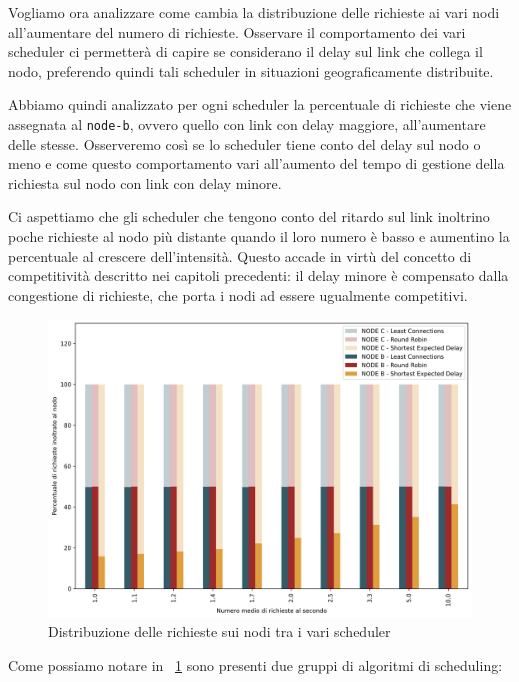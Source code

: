 \documentclass[12pt, hidelinks]{report}
\begin{document}
Vogliamo ora analizzare come cambia la distribuzione delle richieste ai vari nodi all'aumentare del numero di richieste. Osservare il comportamento dei vari scheduler ci permetterà di capire se considerano il delay sul link che collega il nodo, preferendo quindi tali scheduler in situazioni geograficamente distribuite.

Abbiamo quindi analizzato per ogni scheduler la percentuale di richieste che viene assegnata al \texttt{node-b}, ovvero quello con link con delay maggiore, all'aumentare delle stesse. Osserveremo così se lo scheduler tiene conto del delay sul nodo o meno e come questo comportamento vari all'aumento del tempo di gestione della richiesta sul nodo con link con delay minore. 

Ci aspettiamo che gli scheduler che tengono conto del ritardo sul link inoltrino poche richieste al nodo più distante quando il loro numero è basso e aumentino la percentuale al crescere dell'intensità. Questo accade in virtù del concetto di competitività descritto nei capitoli precedenti: il delay minore è compensato dalla congestione di richieste, che porta i nodi ad essere ugualmente competitivi.

\begin{figure}[H]
    \centering
    \includegraphics[width=\linewidth]{15_grafico_scheduler.png}
    \caption{Distribuzione delle richieste sui nodi tra i vari scheduler}
    \label{fig:grafico-scheduler}
\end{figure}

Come possiamo notare in \figurename~\ref{fig:grafico-scheduler} sono presenti due gruppi di algoritmi di scheduling:
\end{document}
